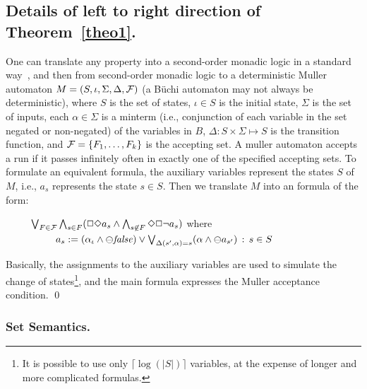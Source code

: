 \documentclass{llncs}
\begin{document}
\subsection*{Details of left to right direction of Theorem~\ref{theo1}.}
One can translate any \QLTL{} property into a second-order monadic logic in a standard
way~\cite{Thomas}, and then from
second-order monadic logic to a deterministic Muller automaton $M = (S, \iota , \Sigma, \Delta, {\cal F})$ (a B\"{u}chi automaton may not always be deterministic), where $S$ is the set of states, $\iota \in S$ is the initial state, $\Sigma$ is the set of inputs, each $\alpha \in \Sigma$ is a minterm (i.e., conjunction of
each variable in the set negated or non-negated) of the variables in $B$, $\Delta : S \times \Sigma \mapsto S$ is the transition function, and ${\cal F} = \{ F_1 , \ldots , F_k \}$ is the accepting set. A muller automaton 
accepts a run if it 
passes infinitely often in exactly
one of the specified accepting sets. To formulate an equivalent \ELTL{} formula,
the auxiliary variables represent the states $S$ of $M$, i.e., $a_s$ represents the state $s \in S$.
Then we translate $M$ into an \ELTL{} formula
of the form: 

\begin{tabbing}
\ \ \ \ \ $\bigvee_{F \in {\cal F}} \bigwedge_{s \in F} ( \Box\Diamond a_s \wedge \bigwedge_{s \not\in F} \Diamond \Box \neg a_s)$
where \\
\ \ \ \ \ \ \ \ \ \ $a_s :=   ( \alpha_{\iota} \wedge \ominus \mathit{false} ) \vee \bigvee_{\Delta ( s'
, \alpha ) = s } 
(\alpha \wedge \ominus a_{s'}) 
\, :\,  s \in S$
\end{tabbing}

\noindent
Basically, the assignments to the auxiliary variables are used to simulate the change of states\footnote{It is possible to use only $\lceil \log ( | S | ) \rceil$
variables, at the expense of longer and more complicated formulas.}, and the main formula expresses the Muller acceptance condition. \qed


\subsubsection*{Set Semantics.}
\end{document}
